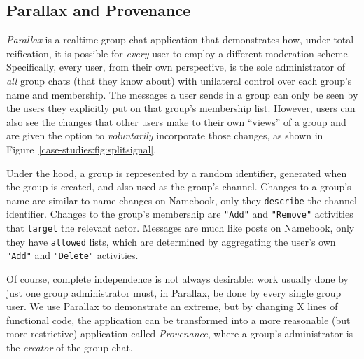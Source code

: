 


\subsection{Parallax and Provenance}

\emph{Parallax} is a realtime group chat application that demonstrates
how, under total reification, it is possible for \emph{every} user to employ a different
moderation scheme.
Specifically,
every user, from their own perspective,
is the sole administrator of \emph{all} group chats (that they know about) with
unilateral control over each group's name and membership.
The messages a user sends in a group can only be seen by the users they explicitly
put on that group's membership list.
However, users can also see the changes that other users
make to their own ``views'' of a group and are given the option
to \emph{voluntarily} incorporate those changes,
as shown in Figure~\ref{case-studies:fig:splitsignal}.

Under the hood, a group is represented by a random identifier,
generated when the group is created, and also used as the group's channel.
Changes to a group's name are similar to name changes on Namebook, only they
\texttt{describe} the channel identifier.
Changes to the group's membership are \texttt{"Add"}
and \texttt{"Remove"} activities that \texttt{target} the relevant actor.
Messages are much like posts on Namebook, only they have \texttt{allowed} lists, which are determined
by aggregating the user's own \texttt{"Add"} and \texttt{"Delete"} activities.

Of course, complete independence is not always desirable:
work usually done by just one group administrator must, in Parallax,
be done by every single group user.
We use Parallax to demonstrate an extreme, but by changing X lines of functional code,
the application can be transformed into a more reasonable (but more restrictive) application called \emph{Provenance},
where a group's administrator is the  \emph{creator} of the group chat.

